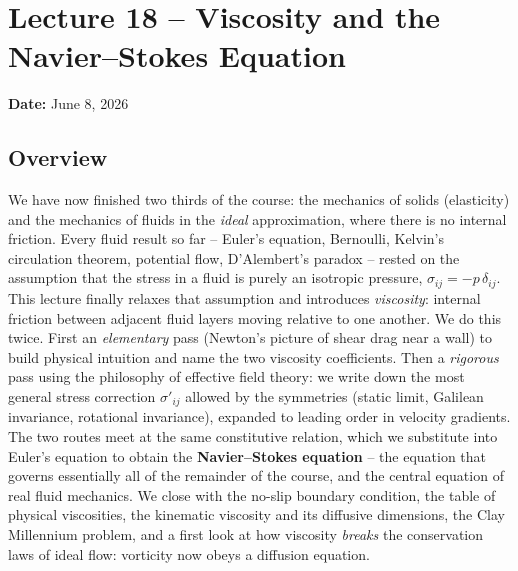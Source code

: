 \documentclass[../main.tex]{subfiles}
\begin{document}
\section{Lecture 18 -- Viscosity and the Navier--Stokes Equation}\label{sec:lec18}
\begin{center}
  \textbf{Date:} June 8, 2026
\end{center}

\subsection*{Overview}
We have now finished two thirds of the course: the mechanics of solids (elasticity) and the mechanics of fluids in the \emph{ideal} approximation, where there is no internal friction. Every fluid result so far -- Euler's equation, Bernoulli, Kelvin's circulation theorem, potential flow, D'Alembert's paradox -- rested on the assumption that the stress in a fluid is purely an isotropic pressure, $\sigma_{ij}=-p\,\delta_{ij}$. This lecture finally relaxes that assumption and introduces \emph{viscosity}: internal friction between adjacent fluid layers moving relative to one another. We do this twice. First an \emph{elementary} pass (Newton's picture of shear drag near a wall) to build physical intuition and name the two viscosity coefficients. Then a \emph{rigorous} pass using the philosophy of effective field theory: we write down the most general stress correction $\sigma'_{ij}$ allowed by the symmetries (static limit, Galilean invariance, rotational invariance), expanded to leading order in velocity gradients. The two routes meet at the same constitutive relation, which we substitute into Euler's equation to obtain the \textbf{Navier--Stokes equation} -- the equation that governs essentially all of the remainder of the course, and the central equation of real fluid mechanics. We close with the no-slip boundary condition, the table of physical viscosities, the kinematic viscosity and its diffusive dimensions, the Clay Millennium problem, and a first look at how viscosity \emph{breaks} the conservation laws of ideal flow: vorticity now obeys a diffusion equation.
\end{document}
